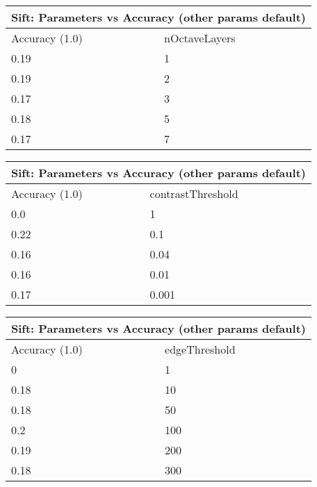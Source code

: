 \documentclass[12pt]{article}
\begin{document}
    \vspace*{0.5cm}
    \begin{tabular}{ |p{1.5cm}||p{2cm}| }
        \hline
        \multicolumn{2}{|c|}{Sift: Parameters vs Accuracy (other params default)} \\
        \hline
        Accuracy (1.0) & nOctaveLayers \\
        \hline
        0.19 & 1 \\
        \hline
        0.19 & 2 \\
        \hline
        0.17 & 3 \\
        \hline
        0.18 & 5 \\
        \hline
        0.17 & 7 \\
        \hline
    \end{tabular}

    \vspace*{0.5cm}
    \begin{tabular}{ |p{1.5cm}||p{2cm}| }
        \hline
        \multicolumn{2}{|c|}{Sift: Parameters vs Accuracy (other params default)} \\
        \hline
        Accuracy (1.0) & contrastThreshold \\
        \hline
        0.0 & 1 \\
        \hline
        0.22 & 0.1 \\
        \hline
        0.16 & 0.04 \\
        \hline
        0.16 & 0.01 \\
        \hline
        0.17 & 0.001 \\
        \hline
    \end{tabular}

    \vspace*{0.5cm}
    \begin{tabular}{ |p{1.5cm}||p{2cm}| }
        \hline
        \multicolumn{2}{|c|}{Sift: Parameters vs Accuracy (other params default)} \\
        \hline
        Accuracy (1.0) & edgeThreshold \\
        \hline
        0 & 1 \\
        \hline
        0.18 & 10 \\
        \hline
        0.18 & 50 \\
        \hline
        0.2 & 100 \\
        \hline
        0.19 & 200 \\
        \hline
        0.18 & 300 \\
        \hline
    \end{tabular}
\end{document}
